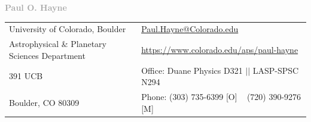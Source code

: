 \documentclass[letterpaper,10pt,twoside]{article}
\begin{document}
\raggedbottom

\vspace{-0.1in}
\noindent  \LARGE{\textbf{\textcolor{darkgray}{Paul O. Hayne}}}  \\
\vspace{-0.75em}
\normalsize

\noindent\hrulefill
\vspace{-1.5em}
\begin{center}
\begin{tabular}{l l}
University of Colorado, Boulder    & \hspace{.25in} \href{mailto:Paul.Hayne@Colorado.edu}{Paul.Hayne@Colorado.edu} \\
 Astrophysical \& Planetary Sciences Department   & \hspace{.25in}  \href{https://www.colorado.edu/aps/paul-hayne}{https://www.colorado.edu/aps/paul-hayne}   \\
 391 UCB             & \hspace{.25in} Office: Duane Physics D321 $||$ LASP-SPSC N294  \\
 Boulder, CO 80309 & \hspace{.25in} Phone: (303) 735-6399 [O] ~ (720) 390-9276 [M] \\
\end{tabular}

\end{center}
\vspace{-0.5em}
\noindent\hrulefill

\end{document}
